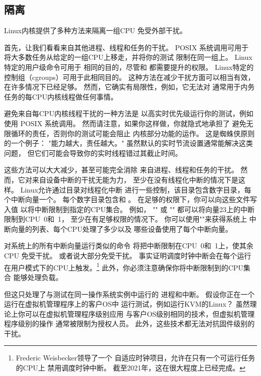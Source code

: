 \subsection{隔离}
\label{sec:debugging:Isolation}

Linux内核提供了多种方法来隔离一组CPU
免受外部干扰。

首先，让我们看看来自其他进程、线程和任务的干扰。
POSIX 系统调用可用于
将大多数任务从给定的一组CPU上移走，并将你的测试
限制在同一组上。
Linux特定的用户级命令可用于
相同的目的，尽管和
都需要提升的权限。
Linux特定的控制组（cgroups）可用于此相同目的。
这种方法在减少干扰方面可以相当有效，
在许多情况下已经足够。
然而，它确实有局限性，例如，它无法对
通常用于内务任务的每CPU内核线程做任何事情。

避免来自每CPU内核线程干扰的一种方法是
以高实时优先级运行你的测试，例如使用
POSIX 系统调用。
然而请注意，如果你这样做，你就隐式地承担了
避免无限循环的责任，否则你的测试可能会阻止
内核部分功能的运作。
这是蜘蛛侠原则的一个例子：
"能力越大，责任越大。"
虽然默认的实时节流设置通常能解决这类问题，
但它们可能会导致你的实时线程错过其截止时间。

这些方法可以大大减少，甚至可能完全消除
来自进程、线程和任务的干扰。
然而，它对来自设备中断的干扰无能为力，
至少在没有线程化中断的情况下是这样。
Linux允许通过目录对线程化中断
进行一些控制，该目录包含数字目录，每个中断向量一个。
每个数字目录包含和
。
在足够的权限下，你可以向这些文件写入值
以将中断限制到指定的CPU集合。
例如，
""
或
""
都可以将向量23上的中断限制到CPU~0和~1，
至少在有足够权限的情况下。
你可以使用""来获得系统上
中断向量的列表、每个CPU处理了多少以及
哪些设备使用了每个中断向量。

对系统上的所有中断向量运行类似的命令
将把中断限制在CPU~0和~1上，使其余CPU
免受干扰。
或者说大部分免受干扰。
事实证明调度时钟中断会在每个运行在用户模式下的CPU上触发。\footnote{
	Frederic Weisbecker领导了一个
	自适应时钟项目，允许在只有一个可运行任务的CPU上
	禁用调度时钟中断。
	截至2021年，这在很大程度上已经完成。}
此外，你必须注意确保你将中断限制到的CPU集合
能够处理负载。

但这只处理了与测试在同一操作系统实例中运行的
进程和中断。
假设你正在一个运行在虚拟机管理程序上的客户OS中
运行测试，例如运行KVM的Linux？
虽然理论上你可以在虚拟机管理程序级别应用
与客户OS级别相同的技术，但虚拟机管理程序级别的操作
通常被限制为授权人员。
此外，这些技术都无法对抗固件级别的干扰。

